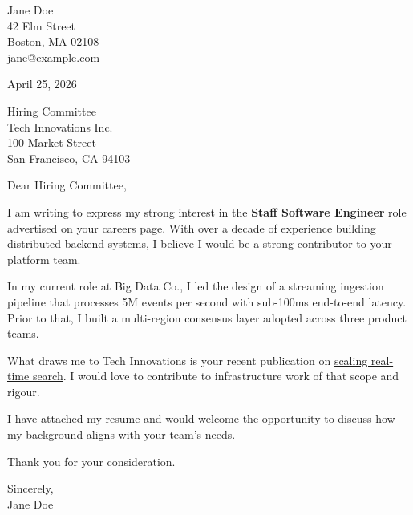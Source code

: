 \documentclass{article}
\begin{document}
\noindent
Jane Doe \\
42 Elm Street \\
Boston, MA 02108 \\
jane@example.com

\vspace{0.3cm}

\noindent April 25, 2026

\vspace{0.3cm}

\noindent
Hiring Committee \\
Tech Innovations Inc.\\
100 Market Street \\
San Francisco, CA 94103

\vspace{0.5cm}

\noindent Dear Hiring Committee,

I am writing to express my strong interest in the \textbf{Staff Software Engineer} role advertised on your careers page. With over a decade of experience building distributed backend systems, I believe I would be a strong contributor to your platform team.

In my current role at Big Data Co., I led the design of a streaming ingestion pipeline that processes 5M events per second with sub-100ms end-to-end latency. Prior to that, I built a multi-region consensus layer adopted across three product teams.

What draws me to Tech Innovations is your recent publication on \href{https://blog.example.com/scaling-search}{scaling real-time search}. I would love to contribute to infrastructure work of that scope and rigour.

I have attached my resume and would welcome the opportunity to discuss how my background aligns with your team's needs.

Thank you for your consideration.

\vspace{0.5cm}

\noindent Sincerely, \\
Jane Doe
\end{document}
